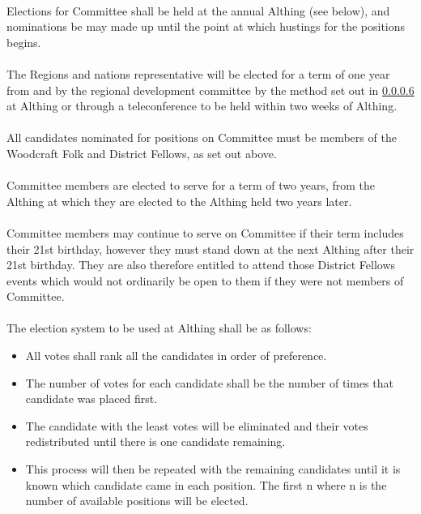 \documentclass[a4paper, 12pt]{article}
\begin{document}
\paragraph{}
Elections for Committee shall be held at the annual Althing (see below), and nominations be may made up until the point at which hustings for the positions begins.

\paragraph{}
The Regions and nations representative will be elected for a term of one year from and by the regional development committee by the method set out in \ref{sec:electionprocedure} at Althing or through a teleconference to be held within two weeks of Althing.

\paragraph{}
All candidates nominated for positions on Committee must be members of the Woodcraft Folk and District Fellows, as set out above.

\paragraph{}
Committee members are elected to serve for a term of two years, from the Althing at which they are elected to the Althing held two years later.

\paragraph{}
Committee members may continue to serve on Committee if their term includes their 21st birthday,  however they must stand down at the next Althing after their 21st birthday.  They are also therefore entitled to attend those District Fellows events which would not ordinarily be open to them if they were not members of Committee.

\paragraph{}
\label{sec:electionprocedure}
The election system to be used at Althing shall be as follows:
\begin{itemize}
\item All votes shall rank all the candidates in order of preference.
\item The number of votes for each candidate shall be the number of times that candidate was placed first.
\item The candidate with the least votes will be eliminated and their votes redistributed until there is one candidate remaining.
\item This process will then be repeated with the remaining candidates until it is known which candidate came in each position. The first n where n is the number of available positions will be elected.
\end{itemize}
\end{document}
